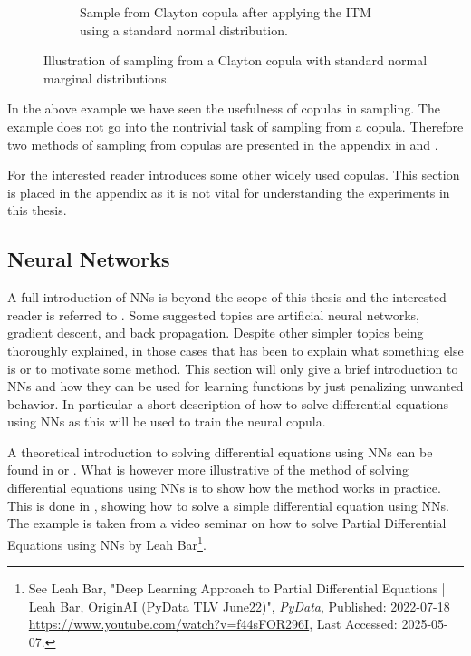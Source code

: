 \begin{figure}[h]
\begin{subfigure}[t]{0.45\linewidth}
        \caption{Sample from Clayton copula after applying the \gls{ITM} using a standard normal distribution.}
        \label{fig:ReturnSpaceDataClayton}
    \end{subfigure}
    \caption{Illustration of sampling from a Clayton copula with standard normal marginal distributions.}
    \label{fig:CopulaSampling}
\end{figure}

In the above example we have seen the usefulness of copulas in sampling. The example does not go into the nontrivial task of sampling from a copula. Therefore two methods of sampling from copulas are presented in the appendix in  and .

For the interested reader  introduces some other widely used copulas. This section is placed in the appendix as it is not vital for understanding the experiments in this thesis. 

\subsection{Neural Networks}
A full introduction of \gls{NN}s is beyond the scope of this thesis and the interested reader is referred to . Some suggested topics are artificial neural networks, gradient descent, and back propagation. Despite other simpler topics being thoroughly explained, in those cases that has been to explain what something else is or to motivate some method. This section will only give a brief introduction to \gls{NN}s and how they can be used for learning functions by just penalizing unwanted behavior. In particular a short description of how to solve differential equations using \gls{NN}s as this will be used to train the neural copula.

A theoretical introduction to solving differential equations using \gls{NN}s can be found in  or . What is however more illustrative of the method of solving differential equations using \gls{NN}s is to show how the method works in practice. This is done in , showing how to solve a simple differential equation using \gls{NN}s. The example is taken from a video seminar on how to solve Partial Differential Equations using \gls{NN}s by Leah Bar\footnote{See Leah Bar, "Deep Learning Approach to Partial Differential Equations | Leah Bar, OriginAI (PyData TLV June22)", \textit{PyData}, Published: 2022-07-18 \url{https://www.youtube.com/watch?v=f44sFOR296I}, Last Accessed: 2025-05-07.}. 

